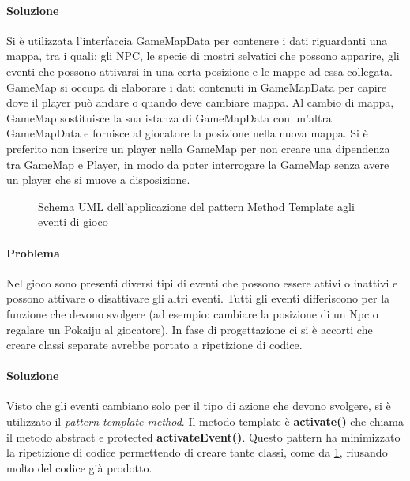 \paragraph{Soluzione}
Si è utilizzata l'interfaccia GameMapData per contenere i dati riguardanti una mappa, tra i quali: gli NPC, le specie di mostri selvatici che possono apparire, gli eventi che possono attivarsi in una certa posizione e le mappe ad essa collegata.
\newline
GameMap si occupa di elaborare i dati contenuti in GameMapData per capire dove il player può andare o quando deve cambiare mappa. Al cambio di mappa, GameMap sostituisce la sua istanza di GameMapData con un'altra GameMapData e fornisce al giocatore la posizione nella nuova mappa. Si è preferito non inserire un player nella GameMap per non creare una dipendenza tra GameMap e Player, in modo da poter interrogare la GameMap senza avere un player che si muove a disposizione.

\begin{figure}[H]
\centering

\caption{Schema UML dell'applicazione del pattern Method Template agli eventi di gioco}
\label{img:GameEvents_UML}
\end{figure}

\paragraph{Problema}
Nel gioco sono presenti diversi tipi di eventi che possono essere attivi o inattivi e possono attivare o disattivare gli altri eventi.
\newline
Tutti gli eventi differiscono per la funzione che devono svolgere (ad esempio: cambiare la posizione di un Npc o regalare un Pokaiju al giocatore). In fase di progettazione ci si è accorti che creare classi separate avrebbe portato a ripetizione di codice.

\paragraph{Soluzione}
Visto che gli eventi cambiano solo per il tipo di azione che devono svolgere, si è utilizzato il \emph{pattern template method}.
\newline
Il metodo template è \textbf{activate()} che chiama il metodo abstract e protected \textbf{activateEvent()}. Questo pattern ha minimizzato la ripetizione di codice permettendo di creare tante classi, come da \cref{img:GameEvents_UML}, riusando molto del codice già prodotto.


